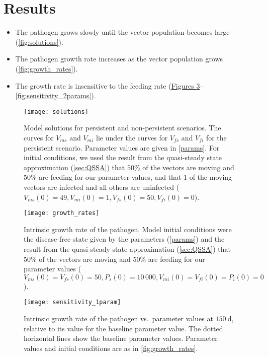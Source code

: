 \documentclass{article}
\begin{document}
\section{Results}

\begin{itemize}
\item The pathogen grows slowly until the vector population becomes
  large (\autoref{fig:solutions}).

\item The pathogen growth rate increases as the vector population
  grows (\autoref{fig:growth_rates}).

\item The growth rate is insensitive to the feeding rate
  (\hyperref[fig:sensitivity_1param]{Figures
    \ref*{fig:sensitivity_1param}}--\ref{fig:sensitivity_2params}).
\end{itemize}


\begin{figure}
  \centering
  \texttt{[image: solutions]}
  \caption{Model solutions for persistent and non-persistent
    scenarios.  The curves for $V_{ms}$ and $V_{mi}$ lie under the
    curves for $V_{fs}$ and $V_{fi}$ for the persistent scenario.
    Parameter values are given in \autoref{params}.
    For initial conditions, we used the result from the quasi-steady
    state approximation (\autoref{sec:QSSA}) that $50\%$ of the
    vectors are moving and $50\%$ are feeding for our parameter
    values, and that 1 of the moving vectors are infected and all
    others are uninfected ($V_{ms}(0) = 49, V_{mi}(0) = 1, V_{fs}(0) =
    50, V_{fi}(0) = 0$).}
  \label{fig:solutions}
\end{figure}

\begin{figure}
  \centering
  \texttt{[image: growth\_rates]}
  \caption{Intrinsic growth rate of the pathogen.  Model initial
    conditions were the disease-free state given by the parameters
    (\autoref{params}) and the result from the quasi-steady state
    approximation (\autoref{sec:QSSA}) that $50\%$ of the vectors are
    moving and $50\%$ are feeding for our parameter values ($V_{ms}(0)
    = V_{fs}(0) = 50, P_s(0) = 10\,000, V_{mi}(0) = V_{fi}(0) = P_i(0)
    = 0$).}
  \label{fig:growth_rates}
\end{figure}

\begin{figure}
  \centering
  \texttt{[image: sensitivity\_1param]}
  \caption{Intrinsic growth rate of the pathogen vs.~parameter values
    at $150~\text{d}$, relative to its value for the baseline
    parameter value.  The dotted horizontal lines show the baseline
    parameter values.  Parameter values and initial conditions are as
    in \autoref{fig:growth_rates}.}
  \label{fig:sensitivity_1param}
\end{figure}
\end{document}
